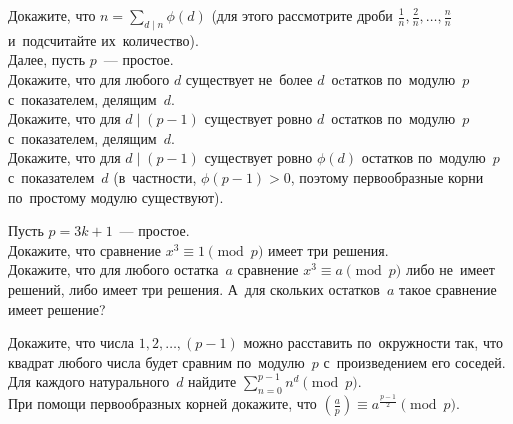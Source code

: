 \begin{problems}

\item
\subproblem
Докажите, что
\(
    n = \sum_{d \mid n} \phi(d)
\)
(для этого рассмотрите дроби $\frac{1}{n}, \frac{2}{n}, \ldots, \frac{n}{n}$
и~подсчитайте их~количество).
\\
Далее, пусть $p$~--- простое.
\\
\subproblem
Докажите, что для любого $d$ существует не~более $d$~оcтатков по~модулю~$p$
с~показателем, делящим~$d$.
\\
\subproblem
Докажите, что для $d \mid (p - 1)$ существует ровно $d$~остатков по~модулю~$p$
с~показателем, делящим~$d$.
\\
\subproblem
Докажите, что для $d \mid (p - 1)$ существует ровно $\phi(d)$ остатков
по~модулю~$p$ с~показателем~$d$
(в~частности, $\phi(p - 1) > 0$, поэтому первообразные корни по~простому модулю
существуют).

\item
Пусть $p = 3 k + 1$~--- простое.
\\
\subproblem
Докажите, что сравнение $x^3 \equiv 1 \pmod p$ имеет три решения.
\\
\subproblem
Докажите, что для любого остатка~$a$ сравнение $x^3 \equiv a \pmod p$ либо
не~имеет решений, либо имеет три решения.
А~для скольких остатков~$a$ такое сравнение имеет решение?

\item
\subproblem
Докажите, что числа $1, 2, \ldots, (p - 1)$ можно расставить по~окружности так,
что квадрат любого числа будет сравним по~модулю~$p$ с~произведением его
соседей.
\\
\subproblem
Для каждого натурального~$d$ найдите
\(
    \sum_{n=0}^{p-1} n^d \pmod p
\).
\\
\subproblem
При помощи первообразных корней докажите, что
\(
    \genfrac{(}{)}{}{}{a}{p}
\equiv
    a^{\frac{p-1}{2}}
\pmod p
\).


\end{problems}

